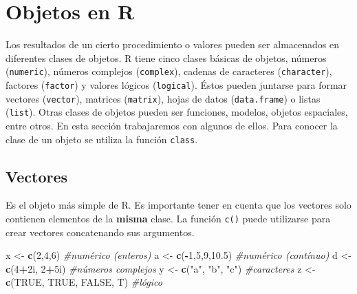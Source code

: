 \documentclass[]{book}
\newenvironment{Shaded}{\begin{snugshade}}{\end{snugshade}}
\newcommand{\KeywordTok}[1]{\textcolor[rgb]{0.13,0.29,0.53}{\textbf{#1}}}
\newcommand{\DecValTok}[1]{\textcolor[rgb]{0.00,0.00,0.81}{#1}}
\newcommand{\FloatTok}[1]{\textcolor[rgb]{0.00,0.00,0.81}{#1}}
\newcommand{\StringTok}[1]{\textcolor[rgb]{0.31,0.60,0.02}{#1}}
\newcommand{\CommentTok}[1]{\textcolor[rgb]{0.56,0.35,0.01}{\textit{#1}}}
\newcommand{\OtherTok}[1]{\textcolor[rgb]{0.56,0.35,0.01}{#1}}
\newcommand{\OperatorTok}[1]{\textcolor[rgb]{0.81,0.36,0.00}{\textbf{#1}}}
\newcommand{\NormalTok}[1]{#1}
\begin{document}
\hypertarget{objetos-en-r}{%
\chapter{Objetos en R}\label{objetos-en-r}}

Los resultados de un cierto procedimiento o valores pueden ser
almacenados en diferentes clases de objetos. R tiene cinco clases
básicas de objetos, números (\texttt{numeric}), números complejos
(\texttt{complex}), cadenas de caracteres (\texttt{character}), factores
(\texttt{factor}) y valores lógicos (\texttt{logical}). Éstos pueden
juntarse para formar vectores (\texttt{vector}), matrices
(\texttt{matrix}), hojas de datos (\texttt{data.frame}) o listas
(\texttt{list}). Otras clases de objetos pueden ser funciones, modelos,
objetos espaciales, entre otros. En esta sección trabajaremos con
algunos de ellos. Para conocer la clase de un objeto se utiliza la
función \texttt{class}.

\hypertarget{vectores}{%
\section{Vectores}\label{vectores}}

Es el objeto más simple de R. Es importante tener en cuenta que los
vectores solo contienen elementos de la \textbf{misma} clase. La función
\texttt{c()} puede utilizarse para crear vectores concatenando sus
argumentos.

\begin{Shaded}
\begin{Highlighting}[]
\NormalTok{x <-}\StringTok{ }\KeywordTok{c}\NormalTok{(}\DecValTok{2}\NormalTok{,}\DecValTok{4}\NormalTok{,}\DecValTok{6}\NormalTok{)                 }\CommentTok{#numérico (enteros) }
\NormalTok{a <-}\StringTok{ }\KeywordTok{c}\NormalTok{(}\OperatorTok{-}\DecValTok{1}\NormalTok{,}\DecValTok{5}\NormalTok{,}\DecValTok{9}\NormalTok{,}\FloatTok{10.5}\NormalTok{)           }\CommentTok{#numérico (contínuo)}
\NormalTok{d <-}\StringTok{ }\KeywordTok{c}\NormalTok{(}\DecValTok{4}\OperatorTok{+}\NormalTok{2i, }\DecValTok{2}\OperatorTok{+}\NormalTok{5i)            }\CommentTok{#números complejos}
\NormalTok{y <-}\StringTok{ }\KeywordTok{c}\NormalTok{(}\StringTok{"a"}\NormalTok{, }\StringTok{"b"}\NormalTok{, }\StringTok{"c"}\NormalTok{)         }\CommentTok{#caracteres}
\NormalTok{z <-}\StringTok{ }\KeywordTok{c}\NormalTok{(}\OtherTok{TRUE}\NormalTok{, }\OtherTok{TRUE}\NormalTok{, }\OtherTok{FALSE}\NormalTok{, T)  }\CommentTok{#lógico}
\end{Highlighting}
\end{Shaded}
\end{document}
